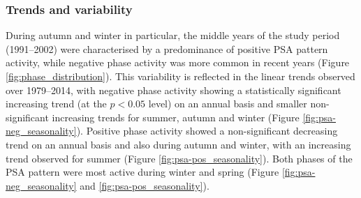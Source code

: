 \subsubsection{Trends and variability}

During autumn and winter in particular, the middle years of the study period (1991--2002) were characterised by a predominance of positive PSA pattern activity, while negative phase activity was more common in recent years (Figure \ref{fig:phase_distribution}). This variability is reflected in the linear trends observed over 1979--2014, with negative phase activity showing a statistically significant increasing trend (at the $p < 0.05$ level) on an annual basis and smaller non-significant increasing trends for summer, autumn and winter (Figure \ref{fig:psa-neg_seasonality}). Positive phase activity showed a non-significant decreasing trend on an annual basis and also during autumn and winter, with an increasing trend observed for summer (Figure \ref{fig:psa-pos_seasonality}). Both phases of the PSA pattern were most active during winter and spring (Figure \ref{fig:psa-neg_seasonality} and \ref{fig:psa-pos_seasonality}). 

